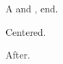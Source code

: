 \documentclass{article}
\begin{document}
A  and , \hfill end.

\begin{center}
Centered.
\end{center}

After.
\end{document}
